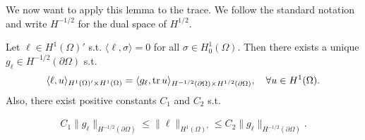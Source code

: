\documentclass[../master_thesis.tex]{subfiles}
\begin{document}
We now want to apply this lemma to the trace. 
We follow the standard notation and write $H^{-1/2}$ for the dual space of 
$H^{1/2}$.
\begin{proposition}\label{prop:existence_gl_in_H12}
    Let $\ell \in H^1(\Omega)'$ s.t. $\langle \ell, \sigma \rangle = 0$
    for all $\sigma \in H^1_0(\Omega)$. Then there exists a unique
    $g_\ell \in H^{-1/2}(\partial \Omega)$ s.t.
    \begin{align}
        \langle \ell, u \rangle_{H^1(\Omega)' \times H^1(\Omega)} 
        = \langle g_\ell, \operatorname{tr} u \rangle_{H^{-1/2}(\partial \Omega) \times H^{1/2}(\partial \Omega)}, 
            \quad \forall u \in H^1(\Omega). \label{eq:functional_as_trace_inner_product}
    \end{align}
    Also, there exist positive constants $C_1$ and $C_2$ s.t.
    
    \begin{align*}
        C_1 \lVert g_\ell \rVert _{H^{-1/2}(\partial \Omega)} \leq  \lVert \ell \rVert _{H^1(\Omega)'}
        \leq C_2 \lVert g_\ell \rVert _{H^{-1/2}(\partial \Omega)}.            
    \end{align*}
\end{proposition}
\end{document}
